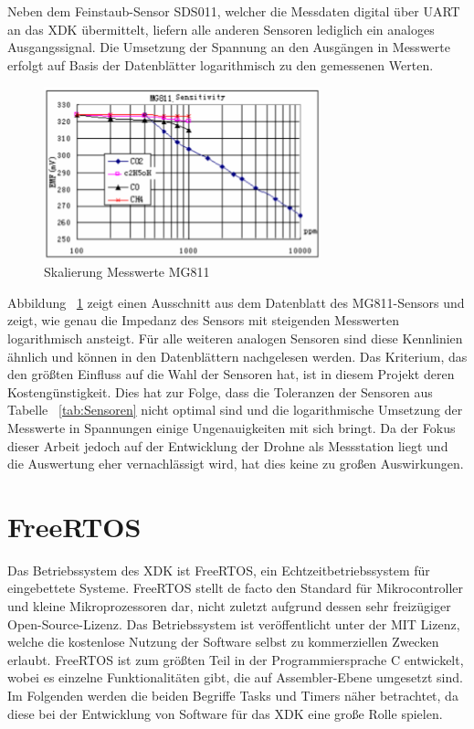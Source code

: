 Neben dem Feinstaub-Sensor SDS011, welcher die Messdaten digital über \acs{UART} an das \acs{XDK} übermittelt, liefern alle anderen Sensoren lediglich ein analoges Ausgangssignal. Die Umsetzung der Spannung an den Ausgängen in Messwerte erfolgt auf Basis der Datenblätter logarithmisch zu den gemessenen Werten. \newline
\begin{figure}[H]
	\centering
	\includegraphics[width=8cm]{images/MG811_Skalierung.png}	
	\caption{Skalierung Messwerte MG811}
	\label{fig:MG811_Skalierung}
\end{figure}
Abbildung ~\ref{fig:MG811_Skalierung} zeigt einen Ausschnitt aus dem Datenblatt des MG811-Sensors und zeigt, wie genau die Impedanz des Sensors mit steigenden Messwerten logarithmisch ansteigt. Für alle weiteren analogen Sensoren sind diese Kennlinien ähnlich und können in den Datenblättern nachgelesen werden.
\newline \newline 
Das Kriterium, das den größten Einfluss auf die Wahl der Sensoren hat, ist in diesem Projekt deren Kostengünstigkeit.
\newline
Dies hat zur Folge, dass die Toleranzen der Sensoren aus Tabelle ~\ref{tab:Sensoren} nicht optimal sind und die logarithmische Umsetzung der Messwerte in Spannungen einige Ungenauigkeiten mit sich bringt. \newline
Da der Fokus dieser Arbeit jedoch auf der Entwicklung der Drohne als Messstation liegt und die Auswertung eher vernachlässigt wird, hat dies keine zu großen Auswirkungen.
\section{FreeRTOS}\label{sec:FreeRTOS}
Das Betriebssystem des \acs*{XDK} ist FreeRTOS, ein Echtzeitbetriebssystem für eingebettete Systeme. FreeRTOS stellt de facto den Standard für Mikrocontroller und kleine Mikroprozessoren dar, nicht zuletzt aufgrund dessen sehr freizügiger Open-Source-Lizenz. Das Betriebssystem ist veröffentlicht unter der MIT Lizenz, welche die kostenlose Nutzung der Software selbst zu kommerziellen Zwecken erlaubt. FreeRTOS ist zum größten Teil in der Programmiersprache C entwickelt, wobei es einzelne Funktionalitäten gibt, die auf Assembler-Ebene umgesetzt sind. Im Folgenden werden die beiden Begriffe Tasks und Timers näher betrachtet, da diese bei der Entwicklung von Software für das \acs*{XDK} eine große Rolle spielen.
